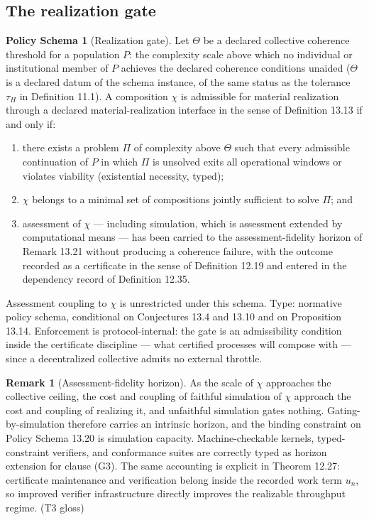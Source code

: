\documentclass[11pt]{article}
\theoremstyle{definition}
\newtheorem{remark}{Remark}
\newtheorem{policyschema}{Policy Schema}
\begin{document}
\subsection{The realization gate}

\begin{policyschema}[Realization gate]
Let $\Theta$ be a declared collective coherence threshold for a population $P$: the complexity scale above which no individual or institutional member of $P$ achieves the declared coherence conditions unaided ($\Theta$ is a declared datum of the schema instance, of the same status as the tolerance $\tau_H$ in Definition 11.1). A composition $\chi$ is admissible for material realization through a declared material-realization interface in the sense of Definition 13.13 if and only if:
\begin{enumerate}[label=(G\arabic*)]
\item[(G1)] there exists a problem $\Pi$ of complexity above $\Theta$ such that every admissible continuation of $P$ in which $\Pi$ is unsolved exits all operational windows or violates viability (existential necessity, typed);
\item[(G2)] $\chi$ belongs to a minimal set of compositions jointly sufficient to solve $\Pi$; and
\item[(G3)] assessment of $\chi$ --- including simulation, which is assessment extended by computational means --- has been carried to the assessment-fidelity horizon of Remark 13.21 without producing a coherence failure, with the outcome recorded as a certificate in the sense of Definition 12.19 and entered in the dependency record of Definition 12.35.
\end{enumerate}
Assessment coupling to $\chi$ is unrestricted under this schema. Type: normative policy schema, conditional on Conjectures 13.4 and 13.10 and on Proposition 13.14. Enforcement is protocol-internal: the gate is an admissibility condition inside the certificate discipline --- what certified processes will compose with --- since a decentralized collective admits no external throttle.
\end{policyschema}

\begin{remark}[Assessment-fidelity horizon]
As the scale of $\chi$ approaches the collective ceiling, the cost and coupling of faithful simulation of $\chi$ approach the cost and coupling of realizing it, and unfaithful simulation gates nothing. Gating-by-simulation therefore carries an intrinsic horizon, and the binding constraint on Policy Schema 13.20 is simulation capacity. Machine-checkable kernels, typed-constraint verifiers, and conformance suites are correctly typed as horizon extension for clause (G3). The same accounting is explicit in Theorem 12.27: certificate maintenance and verification belong inside the recorded work term $u_n$, so improved verifier infrastructure directly improves the realizable throughput regime. (T3 gloss)
\end{remark}
\end{document}
